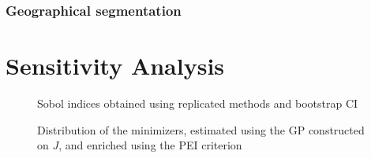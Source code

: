 \documentclass[../../Main_ManuscritThese.tex]{subfiles}
\newcommand\imgpath{/home/victor/acadwriting/Manuscrit/Text/Chapter5/img/}
\begin{document}
\subsubsection{Geographical segmentation}

\section{Sensitivity Analysis}

\begin{figure}[ht]
  \centering
  
  \caption{\label{fig:sobol_indices} Sobol indices obtained using replicated methods and bootstrap CI}
\end{figure}

\begin{figure}[ht]
  \centering
  
  \caption{\label{fig:dist_minimizers} Distribution of the minimizers, estimated using the GP constructed on $J$, and enriched using the PEI criterion}
\end{figure}







\subfileLocal{
	\pagestyle{empty}
	
	
}
\end{document}
